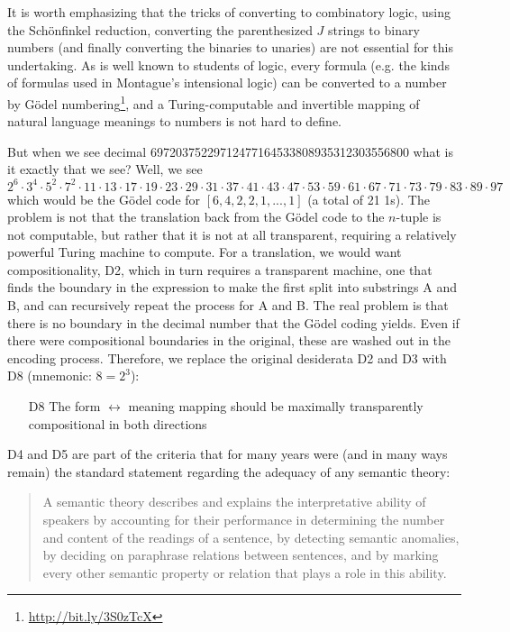 \documentclass[output=paper]{langscibook}
\begin{document}
It is worth emphasizing that the tricks of converting to combinatory logic,
using the Schönfinkel reduction, converting the parenthesized $J$ strings to
binary numbers (and finally converting the binaries to unaries) are not
essential for this undertaking. As is well known to students of logic, every
formula (e.g. the kinds of formulas used in Montague's intensional logic) can
be converted to a number by
Gödel numbering\footnote{\url{http://bit.ly/3S0zTcX}}, and a
Turing-computable and invertible mapping of natural language meanings to
numbers is not hard to define.

But when we see decimal 69720375229712477164533808935312303556800 what is it
exactly that we see? Well, we see $2^6\cdot 3^4\cdot 5^2\cdot 7^2\cdot 11\cdot
13\cdot 17\cdot 19\cdot 23\cdot 29\cdot 31\cdot 37\cdot 41\cdot 43\cdot
47\cdot 53\cdot 59\cdot 61\cdot 67\cdot 71\cdot 73\cdot 79\cdot 83\cdot
89\cdot 97$ which would be the Gödel code for $[6,4,2,2,1,...,1]$ (a
total of 21 1s). The problem is not that the translation back from the Gödel
code to the $n$-tuple is not computable, but rather that it is not at all
transparent, requiring a relatively powerful Turing machine to compute. For a
translation, we would want compositionality, D2, which in turn requires a
transparent machine, one that finds the boundary in the expression to make the
first split into substrings A and B, and can recursively repeat the process
for A and B. The real problem is that there is no boundary in the decimal
number that the Gödel coding yields. Even if there were compositional
boundaries in the original, these are washed out in the encoding process.
Therefore, we replace the original desiderata D2 and D3 with D8 (mnemonic:
$8=2^3$):

\begin{itemize}
\item[D8] The form $\leftrightarrow$ meaning mapping should be maximally
  transparently compositional in both directions
\end{itemize}


D4 and D5 are part of the \citet{Katz:1963} criteria that
for many years were (and in many ways remain) the standard statement regarding
the adequacy of any semantic theory:

\begin{quote}
A semantic theory describes and explains the interpretative ability of
speakers by accounting for their performance in determining the number and
content of the readings of a sentence, by detecting semantic anomalies, by
deciding on paraphrase relations between sentences, and by marking every other
semantic property or relation that plays a role in this ability.
\end{quote}
\end{document}
